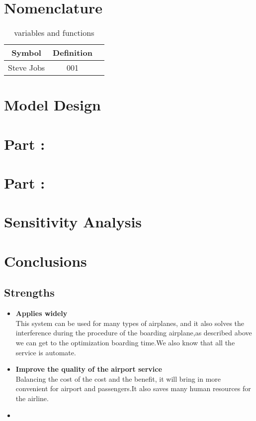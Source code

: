 \documentclass{mcmthesis}
\begin{document}
\section{Nomenclature}
\begin{table}[h]
  \centering
  \begin{tabular}{ccc}
    \hline
    Symbol & Definition\\
    \hline
    Steve Jobs& 001\\
    \hline
  \end{tabular}
  \caption{variables and functions}
\end{table}

\section{ Model Design }

\section{ Part \uppercase\expandafter{}:  }

\section{ Part \uppercase\expandafter{}:  }

\section{Sensitivity Analysis}

\section{Conclusions}
\subsection{Strengths}
\begin{itemize}
  \item \textbf{Applies widely}\\
        This  system can be used for many types of airplanes, and it also
        solves the interference during  the procedure of the boarding
        airplane,as described above we can get to the  optimization
        boarding time.We also know that all the service is automate.
  \item \textbf{Improve the quality of the airport service}\\
        Balancing the cost of the cost and the benefit, it will bring in
        more convenient  for airport and passengers.It also saves many
        human resources for the airline. \item \textbf{}
\end{itemize}
\end{document}

